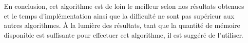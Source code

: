 \documentclass[a4paper, 12pt]{article} %
\begin{document}
    \vspace{12pt}
    En conclusion, cet algorithme est de loin le meilleur selon nos résultats obtenues et le temps
    d'implémentation ainsi que la difficulté ne sont pas supérieur aux autres algorithmes. À la lumière
    des résultats, tant que la quantité de mémoire disponible est suffisante pour effectuer cet algorithme, 
    il est suggéré de l'utiliser.


\end{document}
